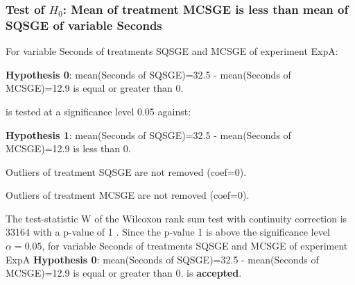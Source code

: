 \begin{frame}[t]
 \frametitle{Test of $H_{0}$: Mean of treatment MCSGE is less than mean of SQSGE of variable Seconds }
 \scriptsize
 For variable Seconds of treatments SQSGE and MCSGE of experiment ExpA:

\vspace{1mm}
{\bf Hypothesis 0}: mean(Seconds of SQSGE)=32.5 - mean(Seconds of MCSGE)=12.9 is equal or greater than 0.


 \begin{center} is tested at a significance level 0.05 against: \end{center}

{\bf Hypothesis 1}: mean(Seconds of SQSGE)=32.5 - mean(Seconds of MCSGE)=12.9 is less than 0.
\vspace{1mm}
\vspace{1mm}

 Outliers of treatment SQSGE  are not removed (coef=0).

 Outliers of treatment MCSGE  are not removed (coef=0).
\vspace{1mm}
 
 The test-statistic W of the Wilcoxon rank sum test with continuity correction is 33164 with a p-value of 1 .
 Since the p-value 1 is above the significance level $\alpha= 0.05 $,
 for variable Seconds of treatments SQSGE and MCSGE of experiment ExpA 
 {\bf Hypothesis 0}: mean(Seconds of SQSGE)=32.5 - mean(Seconds of MCSGE)=12.9 is equal or greater than 0.
is {\bf accepted}.

 \end{frame}
